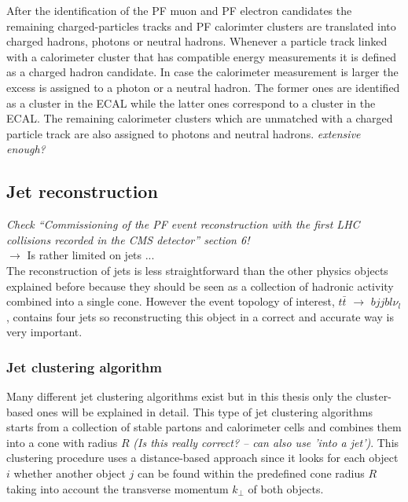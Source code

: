 After the identification of the PF muon and PF electron candidates the remaining charged-particles tracks and PF calorimter clusters are translated into charged hadrons, photons or neutral hadrons.
Whenever a particle track linked with a calorimeter cluster that has compatible energy measurements it is defined as a charged hadron candidate. In case the calorimeter measurement is larger the excess is assigned to a photon or a neutral hadron. The former ones are identified as a cluster in the ECAL while the latter ones correspond to a cluster in the ECAL. The remaining calorimeter clusters which are unmatched with a charged particle track are also assigned to photons and neutral hadrons. \textit{extensive enough?}

\subsection{Jet reconstruction}
 \textit{Check ``Commissioning of the PF event reconstruction with the first LHC collisions recorded in the CMS detector'' section 6!}\\
 $\rightarrow$ Is rather limited on jets ...\\
 
The reconstruction of jets is less straightforward than the other physics objects explained before because they should be seen as a collection of hadronic activity combined into a single cone. However the event topology of interest, $t\bar{t}$ $\rightarrow$ $bjjbl\nu_{l}$, contains four jets so reconstructing this object in a correct and accurate way is very important.
 
\subsubsection*{Jet clustering algorithm}
Many different jet clustering algorithms exist but in this thesis only the cluster-based ones will be explained in detail. This type of jet clustering algorithms starts from a collection of stable partons and calorimeter cells and combines them into a cone with radius $R$ \textit{(Is this really correct? --  can also use 'into a jet')}. This clustering procedure uses a distance-based approach since it looks for each object $i$ whether another object $j$ can be found within the predefined cone radius $R$ taking into account the transverse momentum $k_{\bot}$ of both objects.

